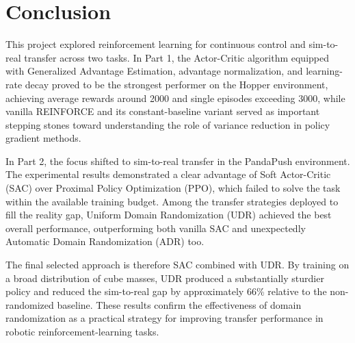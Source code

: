\section{Conclusion}

This project explored reinforcement learning for continuous control and 
sim-to-real transfer across two tasks. In Part 1, the Actor-Critic algorithm 
equipped with Generalized Advantage Estimation, advantage normalization, 
and learning-rate decay proved to be the strongest performer on the Hopper 
environment, achieving average rewards around 2000 and single episodes 
exceeding 3000, while vanilla REINFORCE and its constant-baseline variant 
served as important stepping stones toward understanding the role of 
variance reduction in policy gradient methods.

In Part 2, the focus shifted to sim-to-real transfer in the PandaPush environment. The experimental results demonstrated
a clear advantage of Soft Actor-Critic (SAC) over Proximal Policy Optimization (PPO), which failed to solve the task within
the available training budget. Among the transfer strategies deployed to fill the reality gap,
Uniform Domain Randomization (UDR) achieved the best overall performance, outperforming both vanilla SAC and
unexpectedly Automatic Domain Randomization (ADR) too.

The final selected approach is therefore SAC combined with UDR. By training on a broad distribution of cube masses,
UDR produced a substantially sturdier policy and reduced the sim-to-real gap by approximately 66\% relative to
the non-randomized baseline. These results confirm the effectiveness of domain randomization as a practical strategy
for improving transfer performance in robotic reinforcement-learning tasks.